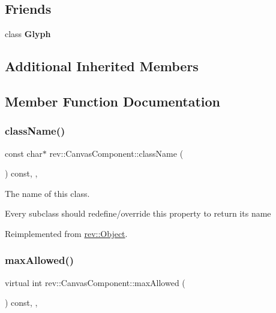 \subsection*{Friends}
\begin{DoxyCompactItemize}
\item 
\mbox{\label{classrev_1_1_canvas_component_ab616e39a2270ec8574bc4b64ecc6a788}} 
class {\bfseries Glyph}
\end{DoxyCompactItemize}
\subsection*{Additional Inherited Members}


\subsection{Member Function Documentation}
\mbox{\label{classrev_1_1_canvas_component_a922be6d092caa93f116babd47dd6343a}} 
\subsubsection{\texorpdfstring{className()}{className()}}
{\footnotesize\ttfamily const char$\ast$ rev\+::\+Canvas\+Component\+::class\+Name (\begin{DoxyParamCaption}{ }\end{DoxyParamCaption}) const\hspace{0.3cm}{\ttfamily [inline]}, {\ttfamily [override]}, {\ttfamily [virtual]}}



The name of this class. 

Every subclass should redefine/override this property to return its name 

Reimplemented from \mbox{\hyperlink{classrev_1_1_object_a7a2013f91169479b65cf93afdc5d9a68}{rev\+::\+Object}}.

\mbox{\label{classrev_1_1_canvas_component_a8d5d6c277edd55e7fd0bbfb29045d44a}} 
\subsubsection{\texorpdfstring{maxAllowed()}{maxAllowed()}}
{\footnotesize\ttfamily virtual int rev\+::\+Canvas\+Component\+::max\+Allowed (\begin{DoxyParamCaption}{ }\end{DoxyParamCaption}) const\hspace{0.3cm}{\ttfamily [inline]}, {\ttfamily [override]}, {\ttfamily [virtual]}}



